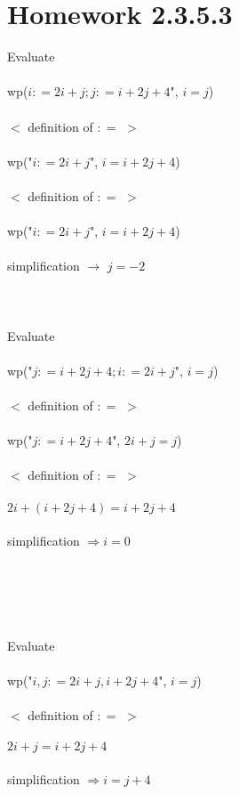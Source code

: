 \documentclass{article}
\begin{document}
\section{Homework 2.3.5.3}
Evaluate
\\
\\
wp($i : = 2i + j; j : = i + 2j + 4$", $i = j$)
\\
\\
$<$ definition of $: = $ $>$
\\
\\
wp("$i : = 2i + j$", $i = i + 2j + 4$)
\\
\\
$<$ definition of $: = $ $>$
\\
\\
wp("$i : = 2i + j$", $i = i + 2j + 4$)
\\
\\
simplification $\rightarrow$ $j = -2$
\\
\\
\\
\\
Evaluate
\\
\\
wp("$j : = i + 2j + 4; i : = 2i + j$", $i = j$)
\\
\\
$<$ definition of $: = $ $>$
\\
\\
wp("$j : = i + 2j + 4$", $2i + j = j$)
\\
\\
$<$ definition of $: = $ $>$
\\
\\
$2i + (i + 2j + 4) = i + 2j + 4$
\\
\\
simplification $\Rightarrow i = 0$
\\
\\
\\
\\
\\
\\
Evaluate
\\
\\
wp("$i, j: = 2i + j, i + 2j + 4$", $i = j$)
\\
\\
$<$ definition of $: = $ $>$
\\
\\
$2i + j = i + 2j + 4$
\\
\\
simplification $\Rightarrow i = j + 4$
\end{document}
